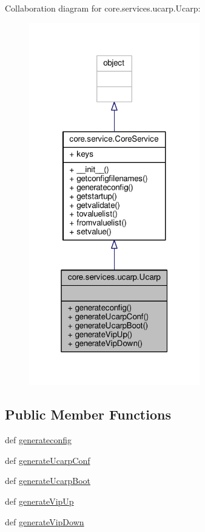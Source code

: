 Collaboration diagram for core.\+services.\+ucarp.\+Ucarp\+:
\nopagebreak
\begin{figure}[H]
\begin{center}
\leavevmode
\includegraphics[width=211pt]{classcore_1_1services_1_1ucarp_1_1_ucarp__coll__graph}
\end{center}
\end{figure}
\subsection*{Public Member Functions}
\begin{DoxyCompactItemize}
\item 
def \hyperlink{classcore_1_1services_1_1ucarp_1_1_ucarp_a5a985791350810c262990296fbb3e1e0}{generateconfig}
\item 
def \hyperlink{classcore_1_1services_1_1ucarp_1_1_ucarp_aa19cdbc6d79fd7c880798faed682ac54}{generate\+Ucarp\+Conf}
\item 
def \hyperlink{classcore_1_1services_1_1ucarp_1_1_ucarp_aeef5b2c9249f954029dd3c04a62f9549}{generate\+Ucarp\+Boot}
\item 
def \hyperlink{classcore_1_1services_1_1ucarp_1_1_ucarp_a5a8e92e1d3a5c2a18725edc937df31f0}{generate\+Vip\+Up}
\item 
def \hyperlink{classcore_1_1services_1_1ucarp_1_1_ucarp_a902ca60d90f5441fd490cf46cf465624}{generate\+Vip\+Down}
\end{DoxyCompactItemize}
